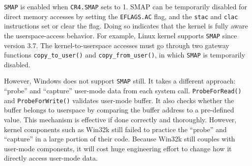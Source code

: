 \texttt{SMAP} is enabled when \texttt{CR4.SMAP} sets to 1. SMAP can be temporarily disabled for direct memory accesses by setting the \texttt{EFLAGS.AC} flag, and the \texttt{stac} and \texttt{clac} instructions set or clear the flag. Doing so indicates that the kernel is fully aware the userspace-access behavior. For example, Linux kernel supports \texttt{SMAP} since version 3.7. The kernel-to-userspace accesses must go through two gateway functions \texttt{copy\_to\_user()} and \texttt{copy\_from\_user()}, in which \texttt{SMAP} is temporarily disabled.

However, Windows does not support \texttt{SMAP} still. It takes a different approach: ``probe'' and ``capture'' user-mode data from each system call. \texttt{ProbeForRead()}~\cite{probeforread} and \texttt{ProbeForWrite()} validates user-mode buffer. It also checks whether the buffer belongs to userspace by comparing the buffer address to a pre-defined value. This mechanism is effective if done correctly and thoroughly. However, kernel components such as Win32k still failed to practice the ``probe'' and ``capture'' in a large portion of their code. Because Win32k still couples with user-mode components, it will cost huge engineering effort to change how it directly access user-mode data.
